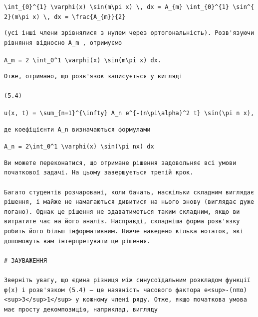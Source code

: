 \documentclass[
  ukrainian,
]{article}
\begin{document}
\texttt{\textbackslash{}int\_\{0\}\^{}\{1\}\ \textbackslash{}varphi(x)\ \textbackslash{}sin(m\textbackslash{}pi\ x)\ \textbackslash{},\ dx\ =\ A\_\{m\}\ \textbackslash{}int\_\{0\}\^{}\{1\}\ \textbackslash{}sin\^{}\{2\}(m\textbackslash{}pi\ x)\ \textbackslash{},\ dx\ =\ \textbackslash{}frac\{A\_\{m\}\}\{2\}}

\begin{verbatim}
(усі інші члени зрівнялися з нулем через ортогональність). Розв'язуючи рівняння відносно A_m , отримуємо
\end{verbatim}

\texttt{A\_m\ =\ 2\ \textbackslash{}int\_0\^{}1\ \textbackslash{}varphi(x)\ \textbackslash{}sin(m\textbackslash{}pi\ x)\ dx.}

\begin{verbatim}
Отже, отримано, що розв'язок записується у вигляді

(5.4)
\end{verbatim}

\texttt{u(x,\ t)\ =\ \textbackslash{}sum\_\{n=1\}\^{}\{\textbackslash{}infty\}\ A\_n\ e\^{}\{-(n\textbackslash{}pi\textbackslash{}alpha)\^{}2\ t\}\ \textbackslash{}sin(\textbackslash{}pi\ n\ x),}

\begin{verbatim}
де коефіцієнти A_n визначаються формулами
\end{verbatim}

\texttt{A\_n\ =\ 2\textbackslash{}int\_0\^{}1\ \textbackslash{}varphi(x)\ \textbackslash{}sin(\textbackslash{}pi\ nx)\ dx}

\begin{verbatim}
Ви можете переконатися, що отримане рішення задовольняє всі умови початкової задачі. На цьому завершується третій крок.

Багато студентів розчаровані, коли бачать, наскільки складним виглядає рішення, і майже не намагаються дивитися на нього знову (виглядає дуже погано). Однак це рішення не здаватиметься таким складним, якщо ви витратите час на його аналіз. Насправді, складніша форма розв'язку робить його більш інформативним. Нижче наведено кілька нотаток, які допоможуть вам інтерпретувати це рішення.

# ЗАУВАЖЕННЯ

Зверніть увагу, що єдина різниця між синусоїдальним розкладом функції φ(x) і розв'язком (5.4) — це наявність часового фактора e<sup>-(nπα)<sup>3</sup>1</sup> у кожному члені ряду. Отже, якщо початкова умова має просту декомпозицію, наприклад, вигляду
\end{verbatim}
\end{document}
